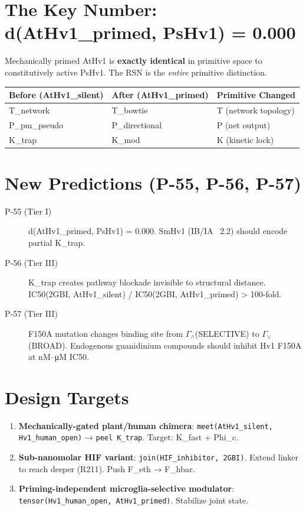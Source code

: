 \documentclass[11pt, a4paper]{article}
\begin{document}
\section{The Key Number: d(AtHv1\_primed, PsHv1) = 0.000}
Mechanically primed AtHv1 is \textbf{exactly identical} in primitive space to constitutively active PsHv1. The RSN is the \textit{entire} primitive distinction.

\begin{center}
\begin{tabular}{|l|l|l|}
\hline
\textbf{Before (AtHv1\_silent)} & \textbf{After (AtHv1\_primed)} & \textbf{Primitive Changed} \\ \hline
T\_network & T\_bowtie & T (network topology) \\ \hline
P\_pm\_pseudo & P\_directional & P (net output) \\ \hline
K\_trap & K\_mod & K (kinetic lock) \\ \hline
\end{tabular}
\end{center}

\section{New Predictions (P-55, P-56, P-57)}
\begin{description}
    \item[P-55 (Tier I)] d(AtHv1\_primed, PsHv1) = 0.000. SmHv1 (IB/IA ~2.2) should encode partial K\_trap.
    \item[P-56 (Tier III)] K\_trap creates pathway blockade invisible to structural distance. IC50(2GBI, AtHv1\_silent) / IC50(2GBI, AtHv1\_primed) > 100-fold.
    \item[P-57 (Tier III)] F150A mutation changes binding site from $\Gamma_\wedge$(SELECTIVE) to $\Gamma_\vee$(BROAD). Endogenous guanidinium compounds should inhibit Hv1 F150A at nM–μM IC50.
\end{description}

\section{Design Targets}
\begin{enumerate}
    \item \textbf{Mechanically-gated plant/human chimera}: \texttt{meet(AtHv1\_silent, Hv1\_human\_open)} → \texttt{peel K\_trap}. Target: K\_fast + Phi\_c.
    \item \textbf{Sub-nanomolar HIF variant}: \texttt{join(HIF\_inhibitor, 2GBI)}. Extend linker to reach deeper (R211). Push F\_eth → F\_hbar.
    \item \textbf{Priming-independent microglia-selective modulator}: \texttt{tensor(Hv1\_human\_open, AtHv1\_primed)}. Stabilize joint state.
\end{enumerate}
\end{document}
